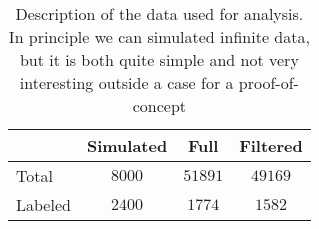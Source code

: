 \begin{table}
\centering
\caption{Description of the data used for analysis. In principle we can simulated infinite data, but it is both quite simple and not very interesting outside a case for a proof-of-concept}
\begin{tabular}{lccc}
\toprule
{} & Simulated & Full & Filtered \\
\midrule
Total &  $8000$ & $51891$ & $49169$ \\
Labeled & $2400$ & $1774$ &  $1582$ \\ 
\bottomrule
\end{tabular}
\end{table}

